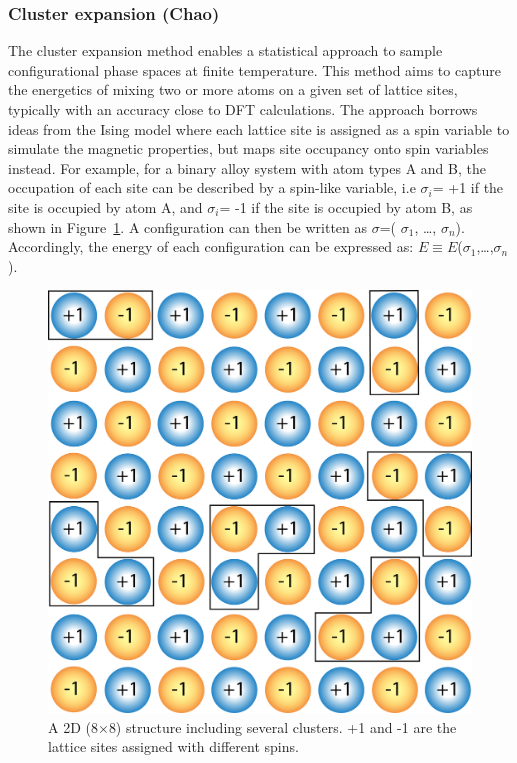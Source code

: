 \documentclass[../main.tex]{subfiles}
\begin{document}
\subsubsection{Cluster expansion (Chao)}
\label{sec:cluster_expansion}
The cluster expansion method enables a statistical approach to sample configurational phase spaces at finite temperature.\cite{sanchez1984generalized,de1994cluster,blum2004mixed} This method aims to capture the energetics of mixing two or more atoms on a given set of lattice sites, typically with an accuracy close to DFT calculations. The approach borrows ideas from the Ising model \cite{gallavotti2013statistical} where each lattice site is assigned as a spin variable to simulate the magnetic properties, but maps site occupancy onto spin variables instead.\cite{persson2010} For example, for a binary alloy system with atom types A and B, the occupation of each site can be described by a spin-like variable, i.e $\sigma_i$= +1 if the site is occupied by atom A, and $\sigma_i$= -1 if the site is occupied by atom B, as shown in Figure~\ref{fig:cluster}. A configuration can then be written as $\sigma$=( $\sigma_1$, …, $\sigma_n$). Accordingly, the energy of each configuration can be expressed as: $E\equiv E$($\sigma_1$,…,$\sigma_n$).

\begin{figure}
    \centering
    \includegraphics[scale=0.5]{figures/clusters.png}
    \caption{A 2D (8$\times$8) structure including several clusters. +1 and -1 are the lattice sites assigned with different spins.}
    \label{fig:cluster}
\end{figure}
\end{document}
